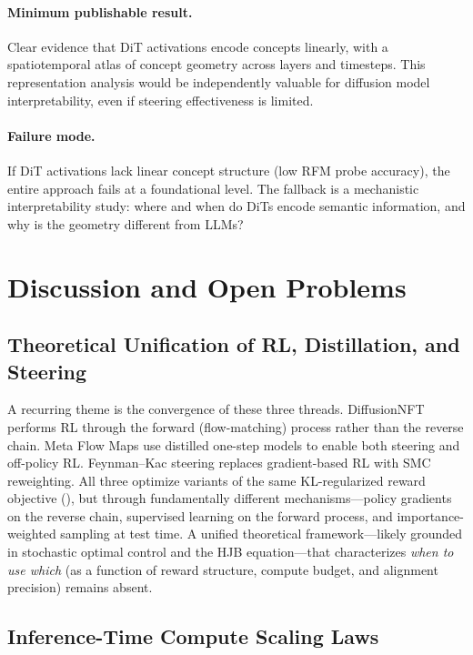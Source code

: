 \documentclass[11pt]{article}
\begin{document}
\paragraph{Minimum publishable result.}
Clear evidence that DiT activations encode concepts linearly, with a spatiotemporal atlas of concept geometry across layers and timesteps.
This representation analysis would be independently valuable for diffusion model interpretability, even if steering effectiveness is limited.

\paragraph{Failure mode.}
If DiT activations lack linear concept structure (low RFM probe accuracy), the entire approach fails at a foundational level.
The fallback is a mechanistic interpretability study: where and when do DiTs encode semantic information, and why is the geometry different from LLMs?

\section{Discussion and Open Problems}
\label{sec:discussion}

\subsection{Theoretical Unification of RL, Distillation, and Steering}

A recurring theme is the convergence of these three threads.
DiffusionNFT \citep{zheng2025diffusionnft} performs RL through the forward (flow-matching) process rather than the reverse chain.
Meta Flow Maps \citep{potaptchik2026meta} use distilled one-step models to enable both steering and off-policy RL.
Feynman--Kac steering \citep{singhal2025fksteering} replaces gradient-based RL with SMC reweighting.
All three optimize variants of the same KL-regularized reward objective (), but through fundamentally different mechanisms---policy gradients on the reverse chain, supervised learning on the forward process, and importance-weighted sampling at test time.
A unified theoretical framework---likely grounded in stochastic optimal control and the HJB equation---that characterizes \emph{when to use which} (as a function of reward structure, compute budget, and alignment precision) remains absent.

\subsection{Inference-Time Compute Scaling Laws}
\end{document}
